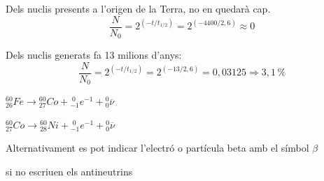 \begin{solapartat}
 Dels nuclis presents a l'origen de la Terra, no en quedarà cap.
\[ \frac{N}{N_0} = 2^{\left(-t/t_{1/2}\right)} = 2^{\left(-4400/2,6\right)} \approx 0 \]

 Dels nuclis generats fa 13 milions d'anys:
\[ \frac{N}{N_0} = 2^{\left(-t/t_{1/2}\right)} = 2^{\left(-13/2,6\right)} = 0,03125 \Rightarrow 3,1\,\% \]
\end{solapartat}

\begin{solapartat}
 ${}^{60}_{26}\mathit{Fe} \longrightarrow {}^{60}_{27}\mathit{Co} + {}^{\;0}_{-1}e^{-1} + {}^{0}_{0}\overline{\nu}$

 ${}^{60}_{27}\mathit{Co} \longrightarrow {}^{60}_{28}\mathit{Ni} + {}^{\;0}_{-1}e^{-1} + {}^{0}_{0}\overline{\nu}$

Alternativament es pot indicar l'electró o partícula beta amb el símbol $\beta$

 si no escriuen els antineutrins
\end{solapartat}
